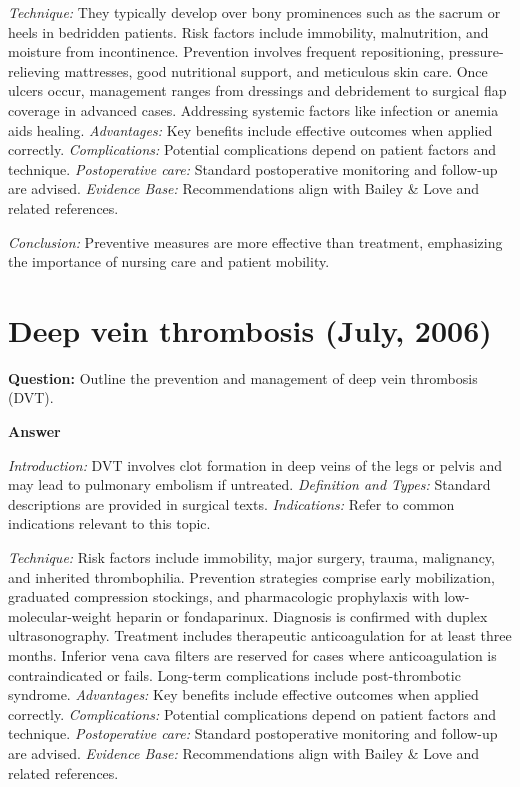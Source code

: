 \documentclass{article}
\begin{document}
\emph{Technique:} They typically develop over bony prominences such as the sacrum or heels in bedridden patients. Risk factors include immobility, malnutrition, and moisture from incontinence. Prevention involves frequent repositioning, pressure-relieving mattresses, good nutritional support, and meticulous skin care. Once ulcers occur, management ranges from dressings and debridement to surgical flap coverage in advanced cases. Addressing systemic factors like infection or anemia aids healing.
\emph{Advantages:} Key benefits include effective outcomes when applied correctly.
\emph{Complications:} Potential complications depend on patient factors and technique.
\emph{Postoperative care:} Standard postoperative monitoring and follow-up are advised.
\emph{Evidence Base:} Recommendations align with Bailey & Love and related references.

\emph{Conclusion:} Preventive measures are more effective than treatment, emphasizing the importance of nursing care and patient mobility.


\section{Deep vein thrombosis (July, 2006)}

\textbf{Question:} Outline the prevention and management of deep vein thrombosis (DVT).

\textbf{Answer}

\emph{Introduction:} DVT involves clot formation in deep veins of the legs or pelvis and may lead to pulmonary embolism if untreated.
\emph{Definition and Types:} Standard descriptions are provided in surgical texts.
\emph{Indications:} Refer to common indications relevant to this topic.

\emph{Technique:} Risk factors include immobility, major surgery, trauma, malignancy, and inherited thrombophilia. Prevention strategies comprise early mobilization, graduated compression stockings, and pharmacologic prophylaxis with low-molecular-weight heparin or fondaparinux. Diagnosis is confirmed with duplex ultrasonography. Treatment includes therapeutic anticoagulation for at least three months. Inferior vena cava filters are reserved for cases where anticoagulation is contraindicated or fails. Long-term complications include post-thrombotic syndrome.
\emph{Advantages:} Key benefits include effective outcomes when applied correctly.
\emph{Complications:} Potential complications depend on patient factors and technique.
\emph{Postoperative care:} Standard postoperative monitoring and follow-up are advised.
\emph{Evidence Base:} Recommendations align with Bailey & Love and related references.
\end{document}
